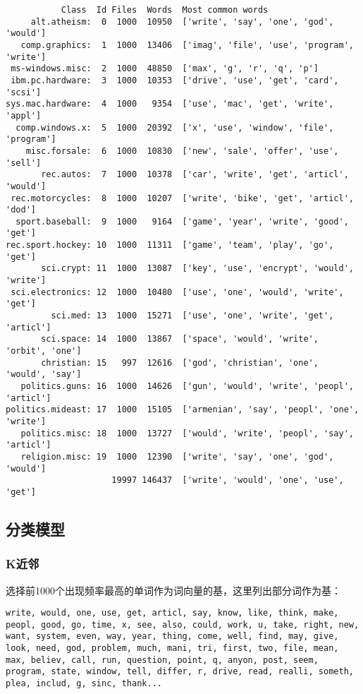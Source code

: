 \documentclass[
]{article}
\begin{document}
\begin{verbatim}
           Class  Id Files  Words  Most common words
     alt.atheism:  0  1000  10950  ['write', 'say', 'one', 'god', 'would']
   comp.graphics:  1  1000  13406  ['imag', 'file', 'use', 'program', 'write']
 ms-windows.misc:  2  1000  48850  ['max', 'g', 'r', 'q', 'p']
 ibm.pc.hardware:  3  1000  10353  ['drive', 'use', 'get', 'card', 'scsi']
sys.mac.hardware:  4  1000   9354  ['use', 'mac', 'get', 'write', 'appl']
  comp.windows.x:  5  1000  20392  ['x', 'use', 'window', 'file', 'program']
    misc.forsale:  6  1000  10830  ['new', 'sale', 'offer', 'use', 'sell']
       rec.autos:  7  1000  10378  ['car', 'write', 'get', 'articl', 'would']
 rec.motorcycles:  8  1000  10207  ['write', 'bike', 'get', 'articl', 'dod']
  sport.baseball:  9  1000   9164  ['game', 'year', 'write', 'good', 'get']
rec.sport.hockey: 10  1000  11311  ['game', 'team', 'play', 'go', 'get']
       sci.crypt: 11  1000  13087  ['key', 'use', 'encrypt', 'would', 'write']
 sci.electronics: 12  1000  10480  ['use', 'one', 'would', 'write', 'get']
         sci.med: 13  1000  15271  ['use', 'one', 'write', 'get', 'articl']
       sci.space: 14  1000  13867  ['space', 'would', 'write', 'orbit', 'one']
       christian: 15   997  12616  ['god', 'christian', 'one', 'would', 'say']
   politics.guns: 16  1000  14626  ['gun', 'would', 'write', 'peopl', 'articl']
politics.mideast: 17  1000  15105  ['armenian', 'say', 'peopl', 'one', 'write']
   politics.misc: 18  1000  13727  ['would', 'write', 'peopl', 'say', 'articl']
   religion.misc: 19  1000  12390  ['write', 'say', 'one', 'god', 'would']
                     19997 146437  ['write', 'would', 'one', 'use', 'get']
\end{verbatim}

\hypertarget{ux5206ux7c7bux6a21ux578b}{%
\subsection{分类模型}\label{ux5206ux7c7bux6a21ux578b}}

\hypertarget{kux8fd1ux90bb}{%
\subsubsection{K近邻}\label{kux8fd1ux90bb}}

选择前1000个出现频率最高的单词作为词向量的基，这里列出部分词作为基：

\begin{verbatim}
write, would, one, use, get, articl, say, know, like, think, make, peopl, good, go, time, x, see, also, could, work, u, take, right, new, want, system, even, way, year, thing, come, well, find, may, give, look, need, god, problem, much, mani, tri, first, two, file, mean, max, believ, call, run, question, point, q, anyon, post, seem, program, state, window, tell, differ, r, drive, read, realli, someth, plea, includ, g, sinc, thank...
\end{verbatim}
\end{document}
